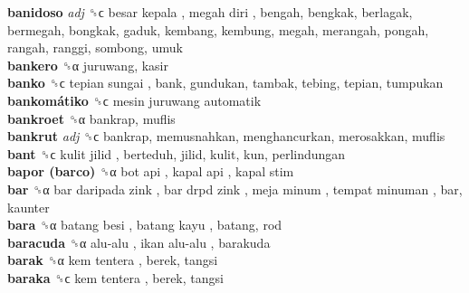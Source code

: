 \textbf{banidoso} \emph{adj}  ␝ϲ   besar kepala ,  megah diri , bengah, bengkak, berlagak, bermegah, bongkak, gaduk, kembang, kembung, megah, merangah, pongah, rangah, ranggi, sombong, umuk  \\
\textbf{bankero} ␝α  juruwang, kasir  \\
\textbf{banko} ␝ϲ   tepian sungai , bank, gundukan, tambak, tebing, tepian, tumpukan  \\
\textbf{bankomátiko} ␝ϲ   mesin juruwang automatik   \\
\textbf{bankroet} ␝α  bankrap, muflis  \\
\textbf{bankrut} \emph{adj}  ␝ϲ  bankrap, memusnahkan, menghancurkan, merosakkan, muflis  \\
\textbf{bant} ␝ϲ   kulit jilid , berteduh, jilid, kulit, kun, perlindungan  \\
\textbf{bapor (barco)} ␝α   bot api ,  kapal api ,  kapal stim   \\
\textbf{bar} ␝α   bar daripada zink ,  bar drpd zink ,  meja minum ,  tempat minuman , bar, kaunter  \\
\textbf{bara} ␝α   batang besi ,  batang kayu , batang, rod  \\
\textbf{baracuda} ␝α   alu-alu ,  ikan alu-alu , barakuda  \\
\textbf{barak} ␝α   kem tentera , berek, tangsi  \\
\textbf{baraka} ␝ϲ   kem tentera , berek, tangsi  \\
